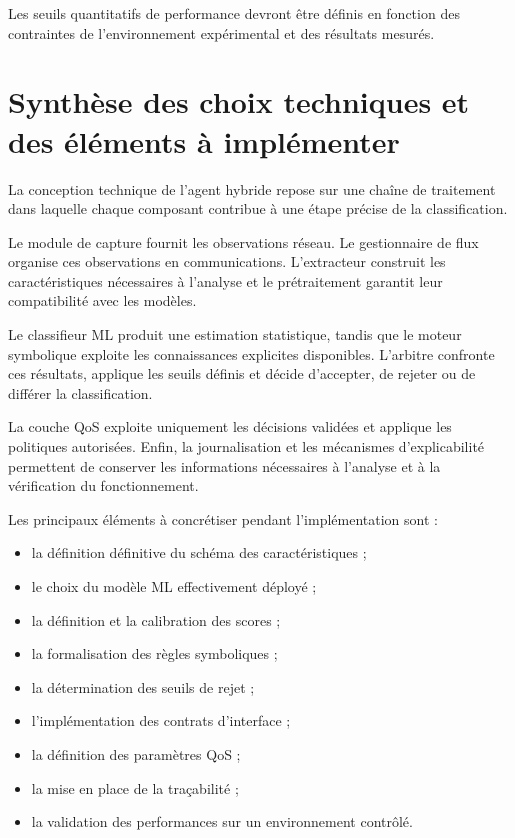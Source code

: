 Les seuils quantitatifs de performance devront être définis en fonction des contraintes de l'environnement expérimental et des résultats mesurés.

\section{Synthèse des choix techniques et des éléments à implémenter}

La conception technique de l'agent hybride repose sur une chaîne de traitement dans laquelle chaque composant contribue à une étape précise de la classification.

Le module de capture fournit les observations réseau. Le gestionnaire de flux organise ces observations en communications. L'extracteur construit les caractéristiques nécessaires à l'analyse et le prétraitement garantit leur compatibilité avec les modèles.

Le classifieur ML produit une estimation statistique, tandis que le moteur symbolique exploite les connaissances explicites disponibles. L'arbitre confronte ces résultats, applique les seuils définis et décide d'accepter, de rejeter ou de différer la classification.

La couche QoS exploite uniquement les décisions validées et applique les politiques autorisées. Enfin, la journalisation et les mécanismes d'explicabilité permettent de conserver les informations nécessaires à l'analyse et à la vérification du fonctionnement.

Les principaux éléments à concrétiser pendant l'implémentation sont :

\begin{itemize}
    \item la définition définitive du schéma des caractéristiques ;
    \item le choix du modèle ML effectivement déployé ;
    \item la définition et la calibration des scores ;
    \item la formalisation des règles symboliques ;
    \item la détermination des seuils de rejet ;
    \item l'implémentation des contrats d'interface ;
    \item la définition des paramètres QoS ;
    \item la mise en place de la traçabilité ;
    \item la validation des performances sur un environnement contrôlé.
\end{itemize}

